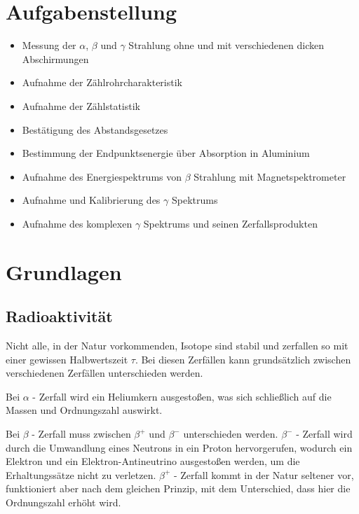\documentclass[12pt,english,ngerman]{scrartcl}
\begin{document}
%
\tableofcontents
\newpage

\section{Aufgabenstellung\label{Auf}}


\begin{itemize}
    \item Messung der \(\alpha\), \(\beta\) und \(\gamma\) Strahlung ohne und mit verschiedenen dicken Abschirmungen
    \item Aufnahme der Zählrohrcharakteristik
    \item Aufnahme der Zählstatistik
    \item Bestätigung des Abstandsgesetzes
    \item Bestimmung der Endpunktsenergie über Absorption in Aluminium
    \item Aufnahme des Energiespektrums von \(\beta\) Strahlung mit Magnetspektrometer
    \item Aufnahme und Kalibrierung des \(\gamma\) Spektrums
    \item Aufnahme des komplexen \(\gamma\) Spektrums und seinen Zerfallsprodukten
\end{itemize}

\section{Grundlagen}\label{Grund}

\subsection{Radioaktivität}
Nicht alle, in der Natur vorkommenden, Isotope sind stabil und zerfallen so mit einer gewissen Halbwertszeit \(\tau\).
Bei diesen Zerfällen kann grundsätzlich zwischen verschiedenen Zerfällen unterschieden werden.

Bei \(\alpha\) - Zerfall wird ein Heliumkern ausgestoßen, was sich schließlich auf die Massen und Ordnungszahl auswirkt.

Bei \(\beta\) - Zerfall muss zwischen \(\beta^+\) und \(\beta^-\) unterschieden werden.
\(\beta^-\) - Zerfall wird durch die Umwandlung eines Neutrons in ein Proton hervorgerufen, wodurch ein Elektron und ein
Elektron-Antineutrino ausgestoßen werden, um die Erhaltungssätze nicht zu verletzen.
\(\beta^+\) - Zerfall kommt in der Natur seltener vor, funktioniert aber nach dem gleichen Prinzip, mit dem Unterschied,
dass hier die Ordnungszahl erhöht wird.
\end{document}
